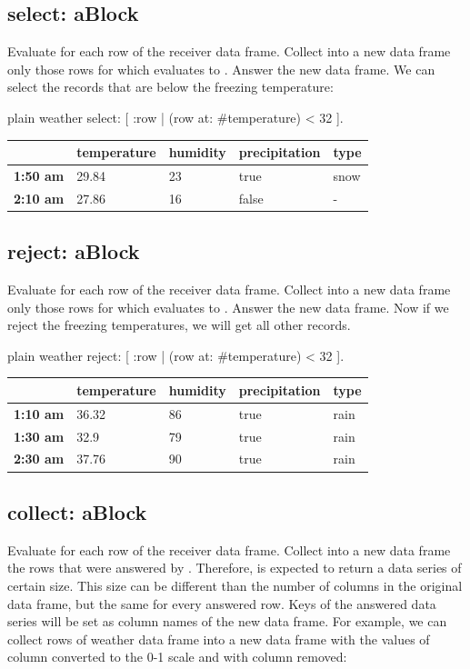 \documentclass[10pt,twoside,english]{_support/latex/sbabook/sbabook}
\begin{document}
\subsection{select: aBlock}
Evaluate  for each row of the receiver data frame. Collect into a new data frame only those rows for which  evaluates to . Answer the new data frame. We can select the records that are below the freezing temperature:

\begin{displaycode}{plain}
weather select: [ :row |
  (row at: #temperature) < 32 ].
\end{displaycode}

\begin{tabular}{lllll}
\toprule
 & \textbf{temperature} & \textbf{humidity} & \textbf{precipitation} & \textbf{type} \\
\midrule
\textbf{1:50 am} & 29.84 & 23 & true & snow \\
\textbf{2:10 am} & 27.86 & 16 & false & - \\
\bottomrule
\end{tabular}
\subsection{reject: aBlock}
Evaluate  for each row of the receiver data frame. Collect into a new data frame only those rows for which  evaluates to . Answer the new data frame. Now if we reject the freezing temperatures, we will get all other records.

\begin{displaycode}{plain}
weather reject: [ :row |
  (row at: #temperature) < 32 ].
\end{displaycode}

\begin{tabular}{lllll}
\toprule
 & \textbf{temperature} & \textbf{humidity} & \textbf{precipitation} & \textbf{type} \\
\midrule
\textbf{1:10 am} & 36.32 & 86 & true & rain \\
\textbf{1:30 am} & 32.9 & 79 & true & rain \\
\textbf{2:30 am} & 37.76 & 90 & true & rain \\
\bottomrule
\end{tabular}
\subsection{collect: aBlock}
Evaluate  for each row of the receiver data frame. Collect into a new data frame the rows that were answered by . Therefore,  is expected to return a data series of certain size. This size can be different than the number of columns in the original data frame, but the same for every answered row. Keys of the answered data series will be set as column names of the new data frame. For example, we can collect rows of weather data frame into a new data frame with the values of  column converted to the 0-1 scale and with  column removed:
\end{document}
